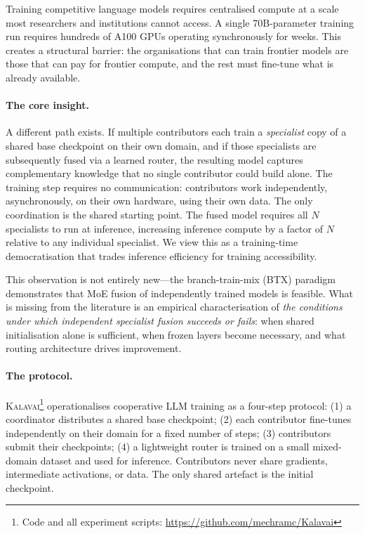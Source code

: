 \documentclass{article}
\newcommand{\kalavai}{\textsc{Kalavai}\xspace}
\begin{document}
Training competitive language models requires centralised compute at a scale most researchers and institutions cannot access. A single 70B-parameter training run requires hundreds of A100 GPUs operating synchronously for weeks. This creates a structural barrier: the organisations that can train frontier models are those that can pay for frontier compute, and the rest must fine-tune what is already available.

\paragraph{The core insight.} A different path exists. If multiple contributors each train a \emph{specialist} copy of a shared base checkpoint on their own domain, and if those specialists are subsequently fused via a learned router, the resulting model captures complementary knowledge that no single contributor could build alone. The training step requires no communication: contributors work independently, asynchronously, on their own hardware, using their own data. The only coordination is the shared starting point. The fused model requires all $N$ specialists to run at inference, increasing inference compute by a factor of $N$ relative to any individual specialist. We view this as a training-time democratisation that trades inference efficiency for training accessibility.

This observation is not entirely new---the branch-train-mix (BTX) paradigm \citep{sukhbaatar2024branchtrainmix} demonstrates that MoE fusion of independently trained models is feasible. What is missing from the literature is an empirical characterisation of \emph{the conditions under which independent specialist fusion succeeds or fails}: when shared initialisation alone is sufficient, when frozen layers become necessary, and what routing architecture drives improvement.

\paragraph{The protocol.} \kalavai\footnote{Code and all experiment scripts: \url{https://github.com/mechramc/Kalavai}} operationalises cooperative LLM training as a four-step protocol: (1) a coordinator distributes a shared base checkpoint; (2) each contributor fine-tunes independently on their domain for a fixed number of steps; (3) contributors submit their checkpoints; (4) a lightweight router is trained on a small mixed-domain dataset and used for inference. Contributors never share gradients, intermediate activations, or data. The only shared artefact is the initial checkpoint.
\end{document}
